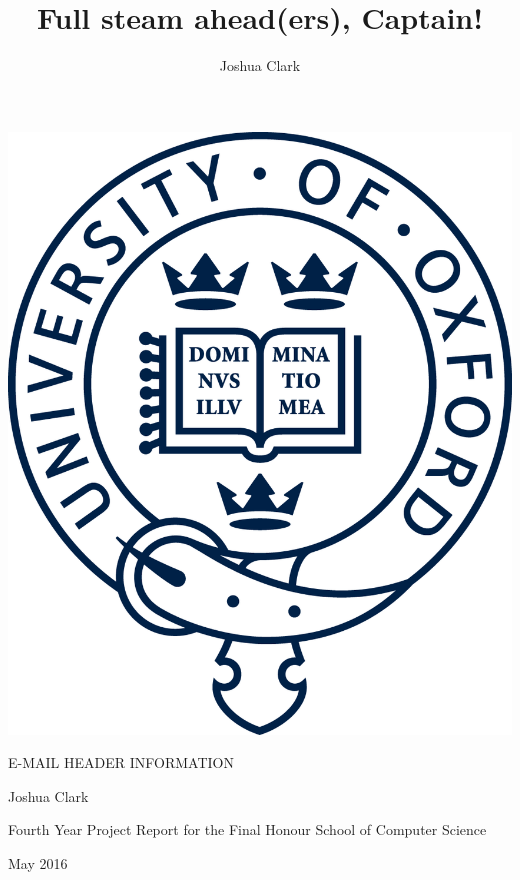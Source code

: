 \documentclass[a4paper,DIV=13,BCOR=7mm,abstract=yes,twoside,10pt]{scrreprt}
\title{Full steam ahead(ers), Captain!} \author{Joshua Clark}
\begin{document}
  \thispagestyle{empty}

  \begin{center} \begin{minipage}[c]{0.75\linewidth} \centering %
  \includegraphics[width=0.4\linewidth]{oxford}

      \vspace{2cm} %
      {\uppercase{\Large{}E-Mail Header Information}{\Large \par}} \vspace{2cm}
      {\Large{}Joshua Clark}{\Large \par}

      \vspace{2cm} %
      {\Large{}Fourth Year Project Report for the Final Honour School of
      Computer Science}{\Large \par}

      \vspace{2cm} %
      {\Large{}May 2016} %
    \end{minipage} \par\end{center}

    \clearpage{}
\end{document}
